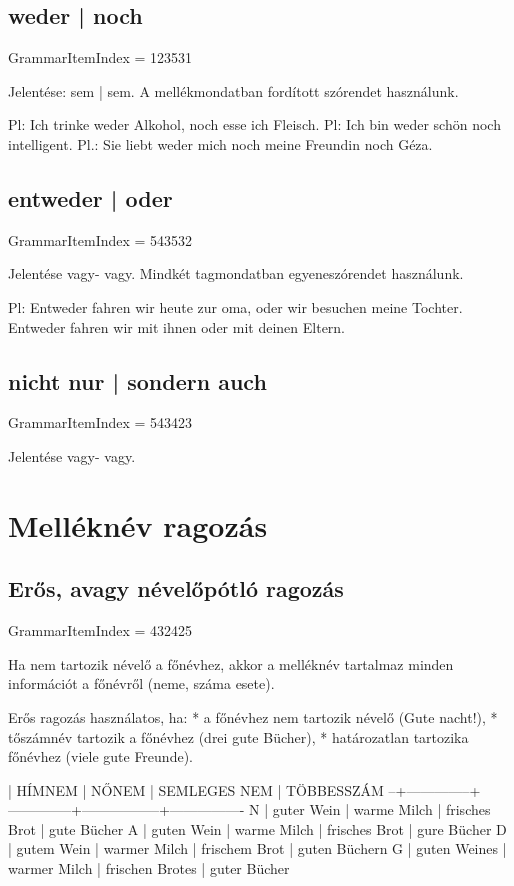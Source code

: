 \documentclass{article}
\newenvironment{desc}{\verbatim}{\endverbatim}
\begin{document}
\subsection{weder | noch}

GrammarItemIndex = 123531

\begin{desc}
Jelentése: sem | sem. A mellékmondatban fordított szórendet használunk.

Pl: Ich trinke weder Alkohol, noch esse ich Fleisch.
Pl: Ich bin weder schön noch intelligent.
Pl.: Sie liebt weder mich noch meine Freundin noch Géza.
\end{desc}

\subsection{entweder | oder}

GrammarItemIndex = 543532

\begin{desc}
Jelentése vagy- vagy. Mindkét tagmondatban egyeneszórendet használunk.

Pl: Entweder fahren wir heute zur oma, oder wir besuchen meine Tochter.
Entweder fahren wir mit ihnen oder mit deinen Eltern.
\end{desc}

\subsection{nicht nur | sondern auch}

GrammarItemIndex = 543423

\begin{desc}
Jelentése vagy- vagy.
\end{desc}

\section{Melléknév ragozás}

\subsection{Erős, avagy névelőpótló ragozás}

GrammarItemIndex = 432425

\begin{desc}
Ha nem tartozik névelő a főnévhez, akkor a melléknév tartalmaz minden információt a főnévről (neme, száma esete).

Erős ragozás használatos, ha:
* a főnévhez nem tartozik névelő (Gute nacht!),
* tőszámnév tartozik a főnévhez (drei gute Bücher),
* határozatlan tartozika főnévhez (viele gute Freunde).

  | HÍMNEM       | NŐNEM        | SEMLEGES NEM    | TÖBBESSZÁM
--+--------------+--------------+-----------------+----------------
N | guter Wein   | warme Milch  | frisches Brot   | gute Bücher
A | guten Wein   | warme Milch  | frisches Brot   | gure Bücher
D | gutem Wein   | warmer Milch | frischem Brot   | guten Büchern
G | guten Weines | warmer Milch | frischen Brotes | guter Bücher
\end{desc}
\end{document}
